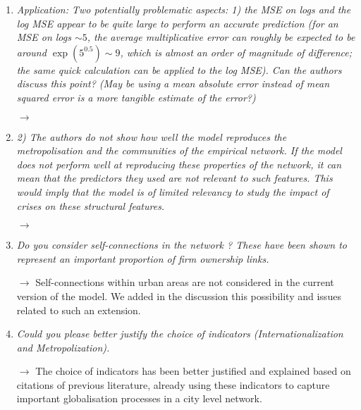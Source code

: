 \documentclass[10pt,a4paper,sans]{moderncv}        %
\begin{document}
\begin{enumerate}

	\item \textit{Application: Two potentially problematic aspects: 1) the MSE on logs and the log MSE appear to be quite large to perform an accurate prediction (for an MSE on logs $\sim 5$, the average multiplicative error can roughly be expected to be around $\exp(5^0.5) \sim 9$, which is almost an order of magnitude of difference; the same quick calculation can be applied to the log MSE). Can the authors discuss this point? (May be using a mean absolute error instead of mean squared error is a more tangible estimate of the error?)}
	
	$\rightarrow$ 
	
	\medskip
	
	\item \textit{2) The authors do not show how well the model reproduces the metropolisation and the communities of the empirical network. If the model does not perform well at reproducing these properties of the network, it can mean that the predictors they used are not relevant to such features. This would imply that the model is of limited relevancy to study the impact of crises on these structural features.}
	
	$\rightarrow$ 
	
	\medskip


	\item \textit{Do you consider self-connections in the network ? These have been shown to represent an important proportion of firm ownership links.}
	
	$\rightarrow$ Self-connections within urban areas are not considered in the current version of the model. We added in the discussion this possibility and issues related to such an extension.
	
	\medskip
	
	\item \textit{Could you please better justify the choice of indicators (Internationalization and Metropolization).}
	
	$\rightarrow$ The choice of indicators has been better justified and explained based on citations of previous literature, already using these indicators to capture important globalisation processes in a city level network.
	

\end{enumerate}
\end{document}
